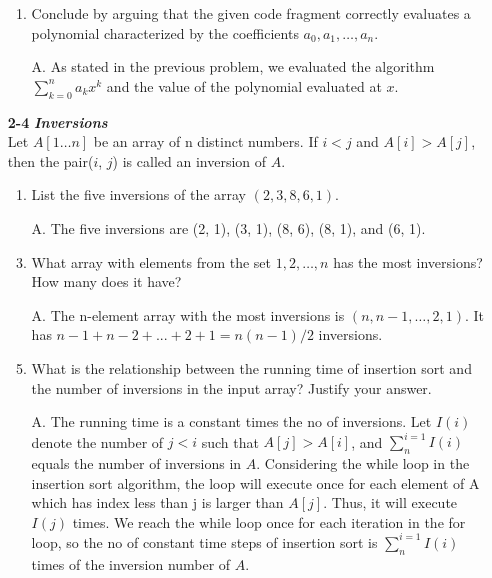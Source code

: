 \documentclass[fontsize=12pt,paper=a4]{book}
\begin{document}
\begin{enumerate}
\begin{enumerate}
        \item Conclude by arguing that the given code fragment correctly evaluates a polynomial characterized by the coefficients $a_0, a_1, \dots , a_n$.
        \item[A.]
              As stated in the previous problem, we evaluated the algorithm $\sum_{k=0}^{n} a_k x^k$ and the value of the polynomial evaluated at $x$.
       \end{enumerate}
       
 \item[\textbf{2-4}]
       \textbf{\textit{Inversions}}\\
       Let $A[1 \dots n]$ be an array of n distinct numbers. If $i < j$ and $A[i] > A[j]$, then the pair($i$, $j$) is called an inversion of $A$.
       \begin{enumerate}
        \item List the five inversions of the array $(2, 3, 8, 6, 1)$.
        \item[A.]
              The five inversions are (2, 1), (3, 1), (8, 6), (8, 1), and (6, 1).
              
        \item What array with elements from the set ${1, 2,\dots,n}$ has the most inversions? How many does it have?
        \item[A.]
              The n-element array with the most inversions is $(n, n-1, \dots , 2, 1)$. It has $n-1+n-2+...+2+1 = n(n-1)/2$ inversions.
              
        \item What is the relationship between the running time of insertion sort and the number of inversions in the input array? Justify your answer.
        \item[A.]
              The running time is a constant times the no of inversions. Let $I(i)$ denote the number of $j < i$ such that $A[j] > A[i]$, and $\sum_{n}^{i=1} I(i)$ equals the number of inversions in $A$. Considering the while loop in the insertion sort algorithm, the loop will execute once for each element of A which has index less than j is larger than $A[j]$. Thus, it will execute $I(j)$ times. We reach the while loop once for each iteration in the for loop, so the no of constant time steps of insertion sort is  $\sum_{n}^{i=1} I(i)$ times of the inversion number of $A$.
              

\end{enumerate}
\end{enumerate}
\end{document}
